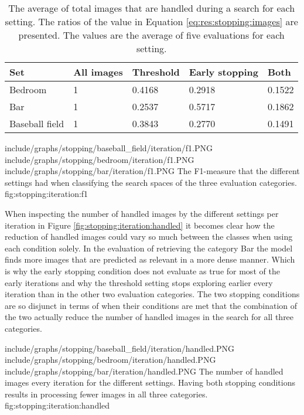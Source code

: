 \begin{table}
\centering
\begin{tabular}{l | p{2.6cm} p{2.6cm} p{3.2cm} p{1.6cm} }
\textbf{Set} & \textbf{All images} & \textbf{Threshold} & \textbf{Early stopping} & \textbf{Both} \\\hline
Bedroom & 1 & 0.4168 & 0.2918 & 0.1522 \\
Bar & 1 & 0.2537 & 0.5717 & 0.1862 \\
Baseball field & 1 & 0.3843 & 0.2770 & 0.1491 
\end{tabular}
\caption{The average of total images that are handled during a search for each setting. The ratios of the value in Equation \ref{eq:res:stopping:images} are presented. The values are the average of five evaluations for each setting.}
\label{table:res:stopping:images}
\end{table}

\tripfigurenear
{include/graphs/stopping/baseball_field/iteration/f1.PNG}
{include/graphs/stopping/bedroom/iteration/f1.PNG}
{include/graphs/stopping/bar/iteration/f1.PNG}
{The F1-measure that the different settings had when classifying the search spaces of the three evaluation categories.}
{fig:stopping:iteration:f1}

When inspecting the number of handled images by the different settings per iteration in Figure \ref{fig:stopping:iteration:handled} it becomes clear how the reduction of handled images could vary so much between the classes when using each condition solely. In the evaluation of retrieving the category Bar the model finds more images that are predicted as relevant in a more dense manner. Which is why the early stopping condition does not evaluate as true for most of the early iterations and why the threshold setting stops exploring earlier every iteration than in the other two evaluation categories. The two stopping conditions are so disjunct in terms of when their conditions are met that the combination of the two actually reduce the number of handled images in the search for all three categories. 

\tripfigurenear
{include/graphs/stopping/baseball_field/iteration/handled.PNG}
{include/graphs/stopping/bedroom/iteration/handled.PNG}
{include/graphs/stopping/bar/iteration/handled.PNG}
{The number of handled images every iteration for the different settings. Having both stopping conditions results in processing fewer images in all three categories.}
{fig:stopping:iteration:handled}


